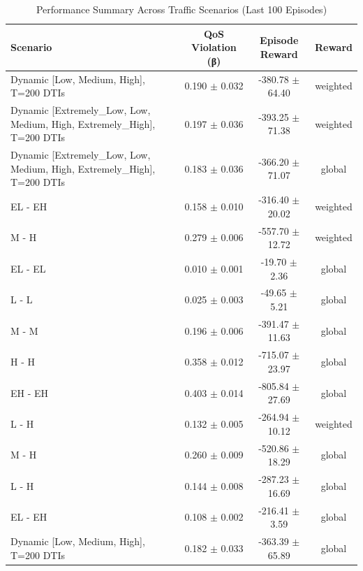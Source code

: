 \begin{table}[!t]
\caption{Performance Summary Across Traffic Scenarios (Last 100 Episodes)}
\label{tab:performance_summary}
\centering
\begin{tabular}{@{}lccc@{}}
\toprule
\textbf{Scenario} & \textbf{QoS Violation (β)} & \textbf{Episode Reward} & \textbf{Reward} \\
\midrule
Dynamic [Low, Medium, High], T=200 DTIs & 0.190 $\pm$ 0.032 & -380.78 $\pm$ 64.40 & weighted \\
Dynamic [Extremely_Low, Low, Medium, High, Extremely_High], T=200 DTIs & 0.197 $\pm$ 0.036 & -393.25 $\pm$ 71.38 & weighted \\
Dynamic [Extremely_Low, Low, Medium, High, Extremely_High], T=200 DTIs & 0.183 $\pm$ 0.036 & -366.20 $\pm$ 71.07 & global \\
EL - EH & 0.158 $\pm$ 0.010 & -316.40 $\pm$ 20.02 & weighted \\
M - H & 0.279 $\pm$ 0.006 & -557.70 $\pm$ 12.72 & weighted \\
EL - EL & 0.010 $\pm$ 0.001 & -19.70 $\pm$ 2.36 & global \\
L - L & 0.025 $\pm$ 0.003 & -49.65 $\pm$ 5.21 & global \\
M - M & 0.196 $\pm$ 0.006 & -391.47 $\pm$ 11.63 & global \\
H - H & 0.358 $\pm$ 0.012 & -715.07 $\pm$ 23.97 & global \\
EH - EH & 0.403 $\pm$ 0.014 & -805.84 $\pm$ 27.69 & global \\
L - H & 0.132 $\pm$ 0.005 & -264.94 $\pm$ 10.12 & weighted \\
M - H & 0.260 $\pm$ 0.009 & -520.86 $\pm$ 18.29 & global \\
L - H & 0.144 $\pm$ 0.008 & -287.23 $\pm$ 16.69 & global \\
EL - EH & 0.108 $\pm$ 0.002 & -216.41 $\pm$ 3.59 & global \\
Dynamic [Low, Medium, High], T=200 DTIs & 0.182 $\pm$ 0.033 & -363.39 $\pm$ 65.89 & global \\
\bottomrule
\end{tabular}
\end{table}
